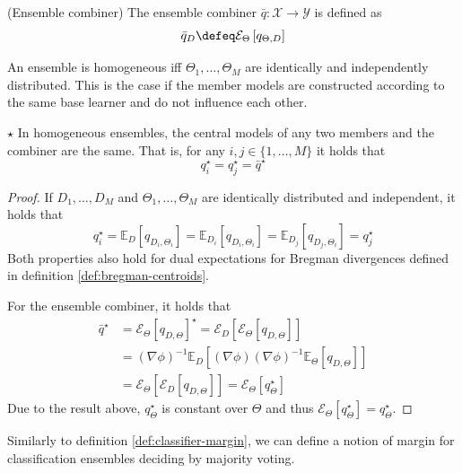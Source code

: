 \documentclass[
    a4paper, %
	fontsize=10pt, %
	twoside=false, %
]{kaobook}
\begin{document}
\begin{titlepage}
\begin{marginfigure}
  \caption{
    Illustration of parallel ensemble learning.
  }
\end{marginfigure}
\begin{definition} (Ensemble combiner) The ensemble combiner $\bar{q} : \mathcal{X} \to \mathcal{Y}$ is defined as 
$$
\bar{q}_{D} \defeq \mathcal{E}_{\Theta}\left[ q_{\Theta, D} \right]
$$
\end{definition}
An ensemble is homogeneous iff $\Theta_{1}, \dots, \Theta_{M}$ are identically and independently distributed. This is the case if the member models are constructed according to the same base learner and do not influence each other. 
\begin{lemma}  $\star$ In homogeneous ensembles, the central models of any two members and the combiner are the same. That is, for any $i, j \in \{ 1, \dots, M \}$ it holds that
$$
q_{i}^\star = q_{j}^\star = \bar{q}^\star
$$
\end{lemma}
\begin{proof}
If $D_{1}, \dots, D_{M}$ and $\Theta_{1}, \dots, \Theta_{M}$ are identically distributed and independent, it holds that
$$
q_{i}^\star = \mathbb{E}_{D}\left[ q_{D_{i}, \Theta_{i}} \right]  = \mathbb{E}_{D_{i}}\left[ q_{D_{i}, \Theta_{i}} \right]  
= \mathbb{E}_{D_{j}}\left[ q_{D_{j}, \Theta_{i}} \right] = q_{j}^\star
$$
Both properties also hold for dual expectations for Bregman divergences defined in definition \ref{def:bregman-centroids}.

For the ensemble combiner, it holds that
\begin{align*}
\bar{q}^\star &= \mathcal{E}_{\Theta}\left[ q_{D,\Theta} \right] ^\star = \mathcal{E}_{D}\left[ \mathcal{E}_{\Theta}\left[ q_{D,\Theta} \right]   \right] \\
&= (\nabla \phi)^{-1} \mathbb{E}_{D}\left[ (\nabla \phi) (\nabla \phi)^{-1} \mathbb{E}_{\Theta}\left[ q_{D,\Theta} \right]   \right] \\
&= \mathcal{E}_{\Theta}\left[ \mathcal{E}_{D}\left[ q_{D, \Theta} \right]  \right] = \mathcal{E}_{\Theta}\left[ q_{\Theta}^\star \right] 
\end{align*}
Due to the result above, $q_{\Theta}^\star$ is constant over $\Theta$ and thus $\mathcal{E}_{\Theta}\left[ q_{\Theta}^\star \right] = q_{\Theta}^\star$.
\end{proof}


Similarly to definition \ref{def:classifier-margin}, we can define a notion of margin for classification ensembles deciding by majority voting. 


\end{titlepage}
\end{document}

